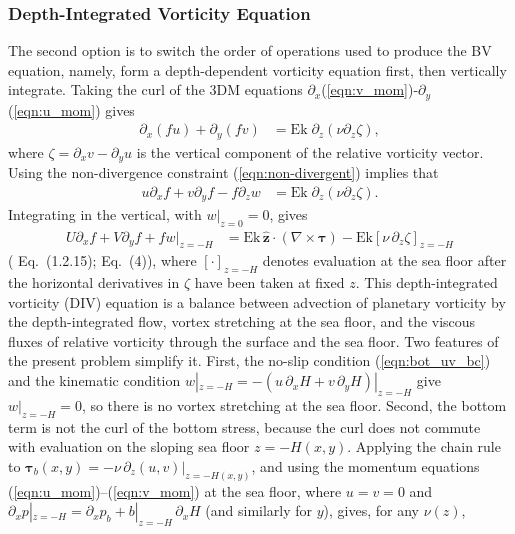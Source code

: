 \documentclass{ametsocV6.2}
\begin{document}
\subsubsection{Depth-Integrated Vorticity Equation}
The second option is to switch the order of operations used to produce the BV equation, namely, form a depth-dependent vorticity equation first, then vertically integrate.
Taking the curl of the 3DM equations $\partial_x$(\ref{eqn:v_mom})-$\partial_y$(\ref{eqn:u_mom}) gives
\begin{align}
\partial_x \left( f u \right) + \partial_y \left( f v \right) & = \mathrm{Ek} \; \partial_{z} \left( \nu \partial_z \zeta \right), \label{eqn:vorticity}
\end{align}
where $\zeta =  \partial_x v - \partial_y u $ is the vertical component of the relative vorticity vector.
Using the non-divergence constraint (\ref{eqn:non-divergent}) implies that
\begin{align}
u \partial_x f + v \partial_y f - f \partial_z w  & = \mathrm{Ek} \; \partial_{z} \left( \nu \partial_z \zeta \right) .
\end{align}
Integrating in the vertical, with $w|_{z=0} = 0$, gives 
\begin{align}
U \partial_x f + V \partial_y f + f  w|_{z = -H} & = \mathrm{Ek} \, \hat{\mathbf{z}} \cdot \left( \nabla \times \boldsymbol{\tau} \right) - \mathrm{Ek} \left[ \nu \, \partial_z \zeta \right]_{z=-H}
\label{eqn:DIV}
\end{align}
(\citealt{pedlosky96} Eq.~(1.2.15); \citealt{waldman&giordani23} Eq.~(4)), where $\left[ \cdot \right]_{z=-H}$ denotes evaluation at the sea floor after the horizontal derivatives in $\zeta$ have been taken at fixed $z$.
This depth-integrated vorticity (DIV) equation is a balance between advection of planetary vorticity by the depth-integrated flow, vortex stretching at the sea floor, and the viscous fluxes of relative vorticity through the surface and the sea floor.
Two features of the present problem simplify it.
First, the no-slip condition (\ref{eqn:bot_uv_bc}) and the kinematic condition $w|_{z=-H} = -\left( u \, \partial_x H + v \, \partial_y H \right)|_{z=-H}$ give $w|_{z=-H} = 0$, so there is no vortex stretching at the sea floor.
Second, the bottom term is not the curl of the bottom stress, because the curl does not commute with evaluation on the sloping sea floor $z = -H(x,y)$.
Applying the chain rule to $\boldsymbol{\tau}_b(x,y) = - \nu \, \partial_z (u, v) |_{z = -H(x,y)}$, and using the momentum equations (\ref{eqn:u_mom})--(\ref{eqn:v_mom}) at the sea floor, where $u = v = 0$ and $\partial_x p |_{z=-H} = \partial_x p_b + b|_{z=-H} \, \partial_x H$ (and similarly for $y$), gives, for any $\nu(z)$,
\end{document}
